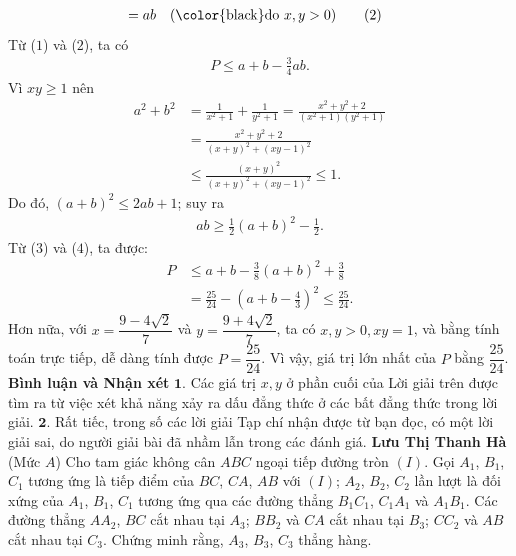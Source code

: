 \begin{multicols}{2}
\begin{align*}
		&= ab \quad(\text{\color{black}do } x,y >0) \tag{$2$}
	\end{align*}
	Từ ($1$) và ($2$), ta có
	\begin{align*}
		P \le a + b - \frac{3}{4}ab. \tag{$3$}
	\end{align*}
	Vì $xy \ge 1$ nên
	\begin{align*}
		{a^2} \!+\! {b^2} &= \frac{1}{{{x^2} \!+\! 1}} \!+\! \frac{1}{{{y^2} \!+\! 1}} \!=\! \frac{{{x^2} \!+\! {y^2} \!+\! 2}}{{\left( {{x^2} \!+\! 1} \right)\!\left( {{y^2} \!+\! 1} \right)}} \\
		&= \frac{{{x^2} + {y^2} + 2}}{{{{\left( {x + y} \right)}^2} + {{\left( {xy - 1} \right)}^2}}} \\
		&\le \frac{{{{\left( {x + y} \right)}^2}}}{{{{\left( {x + y} \right)}^2} + {{\left( {xy - 1} \right)}^2}}} \le 1.
	\end{align*}
	Do đó, ${\left( {a + b} \right)^2} \le 2ab + 1$; suy ra
	\begin{align*}
		ab \ge \frac{1}{2}{\left( {a + b} \right)^2} - \frac{1}{2}.
	\end{align*}
	Từ ($3$) và ($4$), ta được:
	\begin{align*}
		P &\le a + b - \frac{3}{8}{\left( {a + b} \right)^2} + \frac{3}{8}\\
		 &= \frac{{25}}{{24}} - {\left( {a + b - \frac{4}{3}} \right)^2} \le \frac{{25}}{{24}}.
	\end{align*}
	Hơn nữa, với  $x = \dfrac{{9 - 4\sqrt 2 }}{7}$ và  $y = \dfrac{{9 + 4\sqrt 2 }}{7}$, ta có $x, y > 0, xy = 1$, và bằng tính toán trực tiếp, dễ dàng tính được  $P = \dfrac{25}{24}$.
	\vskip 0.05cm
	Vì vậy, giá trị lớn nhất của $P$ bằng  $\dfrac{25}{24}$.
	\vskip 0.05cm
	\textbf{\color{thachthuctoanhoc}Bình luận và Nhận xét}
	\vskip 0.05cm
	$\pmb{1.}$ Các giá trị $x, y$ ở phần cuối của Lời giải trên được tìm ra từ việc xét khả năng xảy ra dấu đẳng thức ở các bất đẳng thức trong lời giải.
	\vskip 0.05cm
	$\pmb{2.}$ Rất tiếc, trong số các lời giải Tạp chí nhận được từ bạn đọc, có một lời giải sai, do người giải bài đã nhầm lẫn trong các đánh giá.
	\vskip 0.05cm
	\hfill\textbf{\color{thachthuctoanhoc}Lưu Thị Thanh Hà}
	\vskip 0.05cm
	{}
	(Mức $A$) Cho tam giác không cân $ABC$ ngoại tiếp đường tròn $(I)$. Gọi $A_1$, $B_1$, $C_1$ tương ứng là tiếp điểm của $BC$, $CA$, $AB$ với $(I)$; $A_2$, $B_2$, $C_2$ lần lượt là đối xứng của $A_1$, $B_1$, $C_1$ tương ứng qua các đường thẳng $B_1C_1$, $C_1A_1$ và $A_1B_1$. Các đường thẳng $AA_2$, $BC$ cắt nhau tại $A_3$; $BB_2$ và $CA$ cắt nhau tại $B_3$; $CC_2$ và $AB$ cắt nhau tại $C_3$. Chứng minh rằng, $A_3$, $B_3$, $C_3$ thẳng hàng.

\end{multicols}
